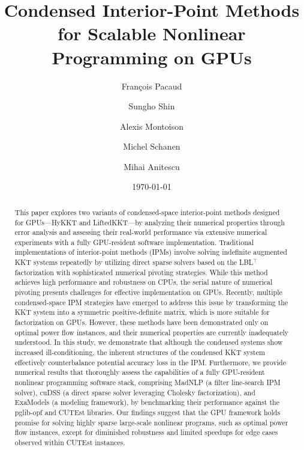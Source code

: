 \documentclass[smallextended]{svjour3}
\title{
 Condensed Interior-Point Methods for Scalable Nonlinear Programming on GPUs
}
\author{François Pacaud \and
Sungho Shin \and
Alexis Montoison \and
Michel Schanen \and
Mihai Anitescu
}
\date{\today}
\begin{document}
\maketitle

\begin{abstract}
This paper explores two variants of condensed-space interior-point methods designed for GPUs—HyKKT and LiftedKKT—by analyzing their numerical properties through error analysis and assessing their real-world performance via extensive numerical experiments with a fully GPU-resident software implementation. Traditional implementations of interior-point methods (IPMs) involve solving indefinite augmented KKT systems repeatedly by utilizing direct sparse solvers based on the LBL$^\top$ factorization with sophisticated numerical pivoting strategies. While this method achieves high performance and robustness on CPUs, the serial nature of numerical pivoting presents challenges for effective implementation on GPUs. Recently, multiple condensed-space IPM strategies have emerged to address this issue by transforming the KKT system into a symmetric positive-definite matrix, which is more suitable for factorization on GPUs. However, these methods have been demonstrated only on optimal power flow instances, and their numerical properties are currently inadequately understood. In this study, we demonstrate that although the condensed systems show increased ill-conditioning, the inherent structures of the condensed KKT system effectively counterbalance potential accuracy loss in the IPM. Furthermore, we provide numerical results that thoroughly assess the capabilities of a fully GPU-resident nonlinear programming software stack, comprising MadNLP (a filter line-search IPM solver), cuDSS (a direct sparse solver leveraging Cholesky factorization), and ExaModels (a modeling framework), by benchmarking their performance against the pglib-opf and CUTEst libraries. Our findings suggest that the GPU framework holds promise for solving highly sparse large-scale nonlinear programs, such as optimal power flow instances, except for diminished robustness and limited speedups for edge cases observed within CUTEst instances.
\end{abstract}









\end{document}

